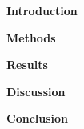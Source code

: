 \textbf{Introduction}

\textbf{Methods}

\textbf{Results}

\textbf{Discussion}

\textbf{Conclusion}
